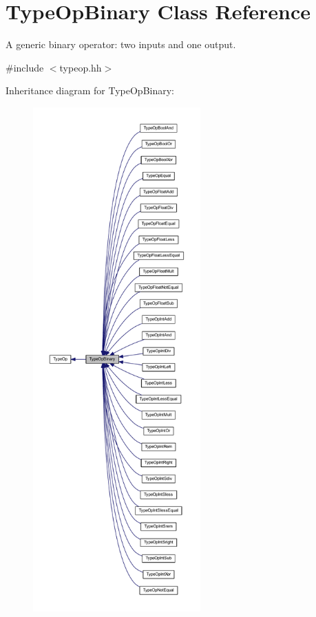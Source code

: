 \hypertarget{class_type_op_binary}{}\section{Type\+Op\+Binary Class Reference}
\label{class_type_op_binary}


A generic binary operator\+: two inputs and one output.  




{\ttfamily \#include $<$typeop.\+hh$>$}



Inheritance diagram for Type\+Op\+Binary\+:
\nopagebreak
\begin{figure}[H]
\begin{center}
\leavevmode
\includegraphics[height=550pt]{class_type_op_binary__inherit__graph}
\end{center}
\end{figure}


